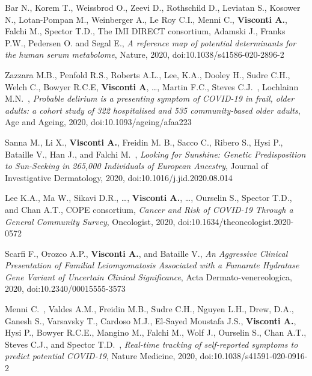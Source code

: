 \begin{itemize}
		
		 Bar N.\cofirst, Korem T.\cofirst, Weissbrod O., Zeevi D., Rothschild D., Leviatan S., Kosower N., Lotan-Pompan M., Weinberger A., Le Roy C.I., Menni C., \textbf{Visconti A.}, Falchi M., Spector T.D., The IMI DIRECT consortium, Adamski J., Franks P.W., Pedersen O. and Segal E.\corresponding, \emph{A reference map of potential determinants for the human serum metabolome}, Nature, 2020, doi:10.1038/s41586-020-2896-2 %
		
		 Zazzara M.B.\cofirst, Penfold R.S.\cofirst, Roberts A.L.\cofirst, Lee, K.A., Dooley H., Sudre C.H., Welch C., Bowyer R.C.E, \textbf{Visconti A}, \dots, Martin F.C., Steves C.J.\colast ~\corresponding, Lochlainn M.N.\colast ~\corresponding, \emph{Probable delirium is a presenting symptom of COVID-19 in frail, older adults: a cohort study of 322 hospitalised and 535 community-based older adults}, Age and Ageing, 2020, doi:10.1093/ageing/afaa223  %
				
		 Sanna M.\cofirst, Li X.\cofirst, \textbf{Visconti A.}, Freidin M. B., Sacco C., Ribero S., Hysi P., Bataille V., Han J.\colast, and Falchi M.\colast ~\corresponding, \emph{Looking for Sunshine: Genetic Predisposition to Sun-Seeking in 265,000 Individuals of European Ancestry}, Journal of Investigative Dermatology, 2020, doi:10.1016/j.jid.2020.08.014	 %
		
		 Lee K.A.\cofirst, Ma W.\cofirst, Sikavi D.R., \dots, \textbf{Visconti A.}, \dots, Ourselin S., Spector T.D., and Chan A.T.\corresponding, COPE consortium, \emph{Cancer and Risk of COVID-19 Through a General Community Survey}, Oncologist, 2020, doi:10.1634/theoncologist.2020-0572  %

		 Scarfi F.\corresponding, Orozco A.P., \textbf{Visconti A.}, and Bataille V., \emph{An Aggressive Clinical Presentation of Familial Leiomyomatosis Associated with a Fumarate Hydratase Gene Variant of Uncertain Clinical Significance}, Acta Dermato-venereologica, 2020, doi:10.2340/00015555-3573 %
		
		 Menni C.\cofirst ~\corresponding, Valdes A.M.\cofirst, Freidin M.B., Sudre C.H., Nguyen L.H., Drew, D.A., Ganesh S., Varsavsky T., Cardoso M.J., El-Sayed Moustafa J.S., \textbf{Visconti A.}, Hysi P., Bowyer R.C.E., Mangino M., Falchi M., Wolf J., Ourselin S., Chan A.T., Steves C.J.\colast, and Spector T.D.\colast ~\corresponding, \emph{Real-time tracking of self-reported symptoms to predict potential COVID-19}, Nature Medicine, 2020, doi:10.1038/s41591-020-0916-2 


\end{itemize}
